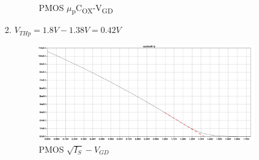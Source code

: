 \documentclass{article}
\begin{document}
\begin{enumerate}
\begin{enumerate}
\begin{enumerate}
\begin{figure}[H]
\caption{\label{fig:pmos-ucox-vgd}PMOS \(\mu\)\textsubscript{p}C\textsubscript{OX}-V\textsubscript{GD}}
\end{figure}
\item \(V_{THp} = 1.8V - 1.38V = 0.42V\)
\begin{figure}[H]
\centering
\includegraphics[width=.9\linewidth]{img/q3/b/pmos-sqrt-is-vgd.pdf}
\caption{\label{fig:nmos-sqrt-is-vgd}PMOS \(\sqrt{I_{S}}-V_{GD}\)}
\end{figure}
\end{enumerate}
\end{enumerate}
\end{enumerate}
\end{document}
